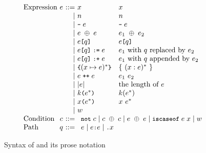 \begin{figure}[t]
\[\begin{array}{l@{~}c@{~}r@{~}lll}
\text{Expression} & \expr &::=&
    \varx & \varx\\
&& \mid&
  \num & \num\\
&& \mid&
  \bcode{-} \; \expr & \bcode{-} \; \expr\\
&& \mid&
  \expr \; \binop \; \expr & \expr_1 \; \binop \; \expr_2\\
&& \mid&
  \expr \kwsl \qual \kwsr & \expr \kwsl \qual \kwsr\\
&& \mid&
  \expr \kwsl \qual \kwsr \; \kwass \; \expr & \mbox{$\expr_1$ with $\qual$ replaced by $\expr_2$}\\
&& \mid&
  \expr \kwsl \qual \kwsr \; \kwext \; \expr & \mbox{$\expr_1$ with $\qual$ appended by $\expr_2$}\\
&& \mid&
  \kwcl (\varx \mapsto \expr)^* \kwcr & \{\ (\varx:\expr)^*\ \}\\
&& \mid&
  \expr \; \kwcat \; \expr & \expr_1~\expr_2\\
&& \mid&
  | \expr | & \mbox{the length of $\expr$}\\
&&\mid&
  \cnstr \kwrl \expr^* \kwrr & \cnstr(\expr^*)\\
&& \mid&
  \varx \kwrl \expr^* \kwrr & \varx~\expr^*\\
&& \mid&
    \wasmc \\

\text{Condition} & \cond &::=&
\multicolumn{2}{l}{
    \kwnot \; \cond \mid
    \cond \; \binop \; \cond \mid
    \expr \; \binop \; \expr \mid
    \kwiscaseof \; \expr \; \varx \mid
    \wasmc
}
\\

\text{Path} & \qual &::=&
\multicolumn{2}{l}{
    \expr \mid
    \expr \bcode{:} \expr \mid
    \bcode{.} x
}
\\
  \end{array}
\]
\vspace*{-1em}
\caption{Syntax of \al and its prose notation}\label{fig:al-syntax}
\end{figure}

